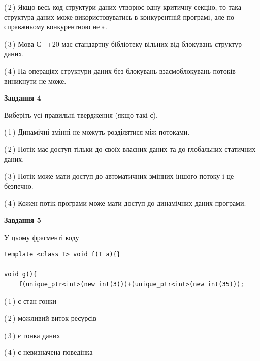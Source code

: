 \documentclass[12pt, ukrainian]{article}
\begin{document}
\begin {large}
{(\,2\,) Якщо весь код структури даних утворює одну критичну секцію, то така структура даних може використовуватись в конкурентній програмі, але по-справжньо\-му конкурентною не є.%

(\,3\,) Мова С++20 має стандартну бібліотеку вільних від блокувань структур даних.%

(\,4\,) На операціях структури даних без блокувань взаємоблокувань потоків виникнути не може.%



\begin{center}
\textbf{Завдання 4}
\end{center}
Виберіть усі правильні твердження (якщо такі є).\par
\vspace{2mm}

(\,1\,) Динамічні змінні не можуть розділятися між потоками.%

(\,2\,) Потік має доступ тільки до своїх власних даних та до глобальних статичних даних.%

(\,3\,) Потік може мати доступ до автоматичних змінних іншого потоку і це безпечно.%

(\,4\,) Кожен потік програми може мати доступ до динамічних даних програми.%



\begin{center}
\textbf{Завдання 5}
\end{center}
У цьому фрагменті коду
\begin{verbatim}
template <class T> void f(T a){}

void g(){
    f(unique_ptr<int>(new int(3)))+(unique_ptr<int>(new int(35)));
\end{verbatim}

(\,1\,) є стан гонки%

(\,2\,) можливий виток ресурсів%

(\,3\,) є гонка даних%

(\,4\,) є невизначена поведінка%


}
\end {large}
\end{document}
